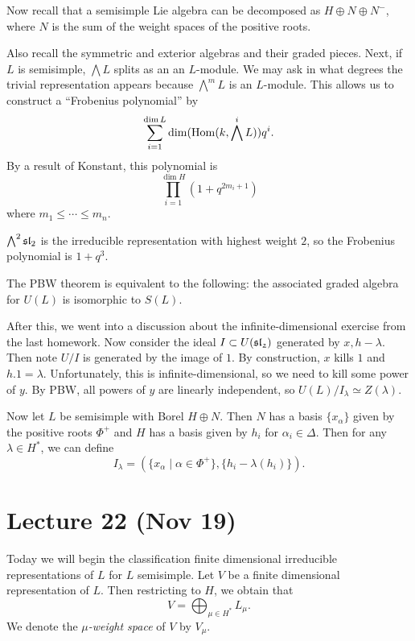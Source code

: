 \documentclass[twoside, 10pt]{article}
\begin{document}
    Now recall that a semisimple Lie algebra can be decomposed as $H \oplus N \oplus N^-$, where $N$ is the sum of the weight spaces of the positive roots.

    Also recall the symmetric and exterior algebras and their graded pieces. Next, if $L$ is semisimple, $\bigwedge L$ splits as an an $L$-module. We may ask in what degrees the trivial representation appears because $\bigwedge^m L$ is an $L$-module. This allows us to construct a ``Frobenius polynomial'' by
    \[ \sum_{i=1}^{\dim L} \dim (\operatorname{Hom}(k, \bigwedge^i L))q^i.\]
    By a result of Konstant, this polynomial is
    \[ \prod_{i=1}^{\dim H} (1 + q^{2m_i + 1}) \] where $m_1 \leq \cdots \leq m_n$.

    \begin{exm}
        $\bigwedge^2 \mathfrak{sl}_2$ is the irreducible representation with highest weight $2$, so the Frobenius polynomial is $1+q^3$.
    \end{exm}

    \begin{cor}
        The PBW theorem is equivalent to the following: the associated graded algebra for $U(L)$ is isomorphic to $S(L)$.
    \end{cor}
    
    After this, we went into a discussion about the infinite-dimensional exercise from the last homework. Now consider the ideal $I \subset U(\mathfrak{{sl}_2})$ generated by $x, h - \lambda$. Then note $U/I$ is generated by the image of $1$. By construction, $x$ kills $1$ and $h.1 = \lambda$. Unfortunately, this is infinite-dimensional, so we need to kill some power of $y$. By PBW, all powers of $y$ are linearly independent, so $U(L)/I_{\lambda} \simeq Z(\lambda)$.

    Now let $L$ be semisimple with Borel $H \oplus N$. Then $N$ has a basis $\{x_{\alpha}\}$ given by the positive roots $\Phi^+$ and $H$ has a basis given by $h_i$ for $\alpha_i \in \Delta$. Then for any $\lambda \in H^*$, we can define
    \[ I_{\lambda} = (\{ x_{\alpha} \mid \alpha \in \Phi^+ \}, \{ h_i - \lambda(h_i) \}). \]

    \section{Lecture 22 (Nov 19)}%
    \label{sec:lecture_22_nov_19_}

    Today we will begin the classification finite dimensional irreducible representations of $L$ for $L$ semisimple. Let $V$ be a finite dimensional representation of $L$. Then restricting to $H$, we obtain that 
    \[V = \bigoplus_{\mu \in H^*} L_{\mu}.\]
    We denote the \textit{$\mu$-weight space} of $V$ by $V_{\mu}$. 
\end{document}
